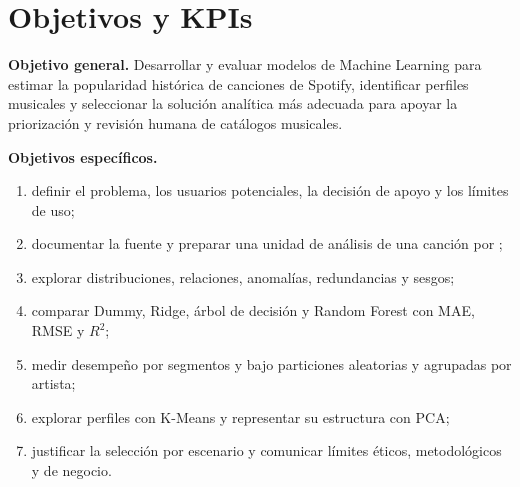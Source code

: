 \section{Objetivos y KPIs}

\textbf{Objetivo general.} Desarrollar y evaluar modelos de Machine Learning para estimar la
popularidad histórica de canciones de Spotify, identificar perfiles musicales y seleccionar la
solución analítica más adecuada para apoyar la priorización y revisión humana de catálogos
musicales.

\textbf{Objetivos específicos.}

\begin{enumerate}
\item definir el problema, los usuarios potenciales, la decisión de apoyo y los límites de uso;
\item documentar la fuente y preparar una unidad de análisis de una canción por ;
\item explorar distribuciones, relaciones, anomalías, redundancias y sesgos;
\item comparar Dummy, Ridge, árbol de decisión y Random Forest con MAE, RMSE y $R^2$;
\item medir desempeño por segmentos y bajo particiones aleatorias y agrupadas por artista;
\item explorar perfiles con K-Means y representar su estructura con PCA;
\item justificar la selección por escenario y comunicar límites éticos, metodológicos y de negocio.
\end{enumerate}

